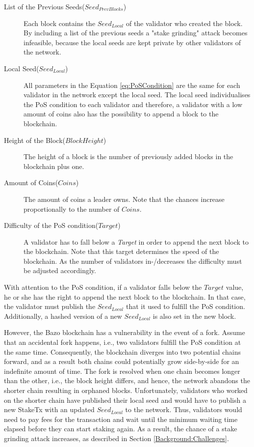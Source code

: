 \documentclass[12pt,a4]{article}
\begin{document}
\begin{description}
  \item[List of the Previous Seeds($Seed_{PrevBlocks}$)] Each block contains the $Seed_{Local}$ of the validator who created the block. By including a list of the previous seeds a "stake grinding" attack becomes infeasible, because the local seeds are kept private by other validators of the network.
  \item[Local Seed($Seed_{Local}$)] All parameters in the Equation \ref{eq:PoSCondition} are the same for each validator in the network except the local seed. The local seed individualises the PoS condition to each validator and therefore, a validator with a low amount of coins also has the possibility to append a block to the blockchain.
  \item[Height of the Block($BlockHeight$)] The height of a block is the number of previously added blocks in the blockchain plus one.
  \item[Amount of Coins($Coins$)] The amount of coins a leader owns. Note that the chances increase proportionally to the number of $Coins$.
  \item[Difficulty of the PoS condition($Target$)] A validator has to fall below a \textit{Target} in order to append the next block to the blockchain. Note that this target determines the speed of the blockchain. As the number of validators in-/decreases the difficulty must be adjusted accordingly.
\end{description}

With attention to the PoS condition, if a validator falls below the $Target$ value, he or she has the right to append the next block to the blockchain. In that case, the validator must publish the $Seed_{Local}$ that it used to fulfill the PoS condition. Additionally, a hashed version of a new $Seed_{Local}$ is also set in the new block.

However, the Bazo blockchain has a vulnerability in the event of a fork. Assume that an accidental fork happens, i.e., two validators fulfill the PoS condition at the same time. Consequently, the blockchain diverges into two potential chains forward, and as a result both chains could potentially grow side-by-side for an indefinite amount of time. The fork is resolved when one chain becomes longer than the other, i.e., the block height differs, and hence, the network abandons the shorter chain resulting in orphaned blocks. Unfortunately, validators who worked on the shorter chain have published their local seed and would have to publish a new StakeTx with an updated $Seed_{Local}$ to the network. Thus, validators would need to pay fees for the transaction and wait until the minimum waiting time elapsed before they can start staking again. As a result, the chance of a stake grinding attack increases, as described in Section \ref{Background:Challenges}.
\end{document}
